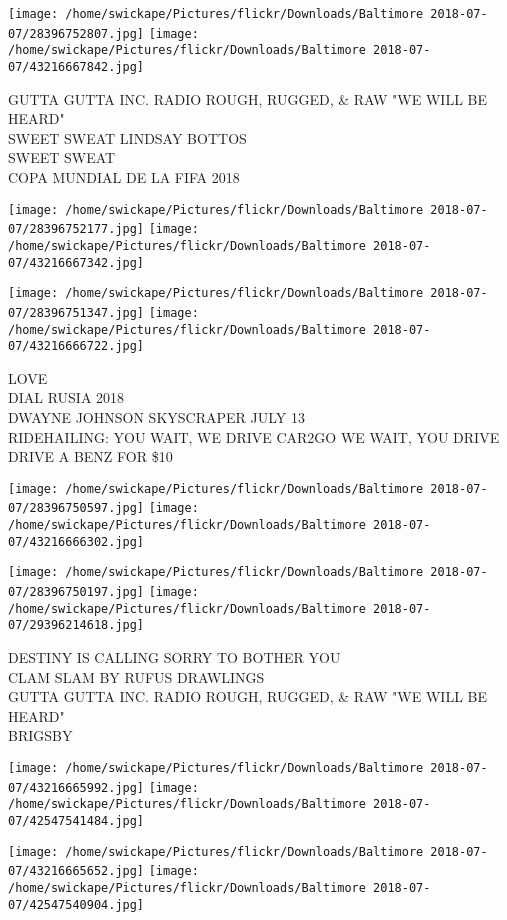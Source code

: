 \documentclass[10pt,letterpaper]{article}
\begin{document}
\texttt{[image: /home/swickape/Pictures/flickr/Downloads/Baltimore 2018-07-07/28396752807.jpg]}
\texttt{[image: /home/swickape/Pictures/flickr/Downloads/Baltimore 2018-07-07/43216667842.jpg]}

GUTTA GUTTA INC. RADIO ROUGH, RUGGED, \& RAW "WE WILL BE HEARD"\\
SWEET SWEAT LINDSAY BOTTOS\\
SWEET SWEAT\\
COPA MUNDIAL DE LA FIFA 2018
\pagebreak

\texttt{[image: /home/swickape/Pictures/flickr/Downloads/Baltimore 2018-07-07/28396752177.jpg]}
\texttt{[image: /home/swickape/Pictures/flickr/Downloads/Baltimore 2018-07-07/43216667342.jpg]}

\texttt{[image: /home/swickape/Pictures/flickr/Downloads/Baltimore 2018-07-07/28396751347.jpg]}
\texttt{[image: /home/swickape/Pictures/flickr/Downloads/Baltimore 2018-07-07/43216666722.jpg]}

LOVE\\
DIAL RUSIA 2018\\
DWAYNE JOHNSON SKYSCRAPER JULY 13\\
RIDEHAILING: YOU WAIT, WE DRIVE CAR2GO WE WAIT, YOU DRIVE DRIVE A BENZ FOR \$10
\pagebreak

\texttt{[image: /home/swickape/Pictures/flickr/Downloads/Baltimore 2018-07-07/28396750597.jpg]}
\texttt{[image: /home/swickape/Pictures/flickr/Downloads/Baltimore 2018-07-07/43216666302.jpg]}

\texttt{[image: /home/swickape/Pictures/flickr/Downloads/Baltimore 2018-07-07/28396750197.jpg]}
\texttt{[image: /home/swickape/Pictures/flickr/Downloads/Baltimore 2018-07-07/29396214618.jpg]}

DESTINY IS CALLING SORRY TO BOTHER YOU\\
CLAM SLAM BY RUFUS DRAWLINGS\\
GUTTA GUTTA INC. RADIO ROUGH, RUGGED, \& RAW "WE WILL BE HEARD"\\
BRIGSBY
\pagebreak

\texttt{[image: /home/swickape/Pictures/flickr/Downloads/Baltimore 2018-07-07/43216665992.jpg]}
\texttt{[image: /home/swickape/Pictures/flickr/Downloads/Baltimore 2018-07-07/42547541484.jpg]}

\texttt{[image: /home/swickape/Pictures/flickr/Downloads/Baltimore 2018-07-07/43216665652.jpg]}
\texttt{[image: /home/swickape/Pictures/flickr/Downloads/Baltimore 2018-07-07/42547540904.jpg]}
\end{document}
